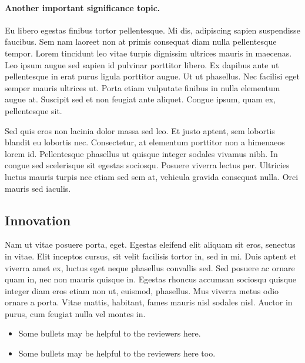 \documentclass[11pt,]{article}
\providecommand{\tightlist}{%
  \setlength{\itemsep}{0pt}\setlength{\parskip}{0pt}}
\let\oldparagraph\paragraph
\renewcommand{\paragraph}[1]{\oldparagraph{#1}\mbox{}}
\begin{document}
\hypertarget{another-important-significance-topic.}{%
\paragraph{Another important significance
topic.}\label{another-important-significance-topic.}}

Eu libero egestas finibus tortor pellentesque. Mi dis, adipiscing sapien
suspendisse faucibus. Sem nam laoreet non at primis consequat diam nulla
pellentesque tempor. Lorem tincidunt leo vitae turpis dignissim ultrices
mauris in maecenas. Leo ipsum augue sed sapien id pulvinar porttitor
libero. Ex dapibus ante ut pellentesque in erat purus ligula porttitor
augue. Ut ut phasellus. Nec facilisi eget semper mauris ultrices ut.
Porta etiam vulputate finibus in nulla elementum augue at. Suscipit sed
et non feugiat ante aliquet. Congue ipsum, quam ex, pellentesque sit.

Sed quis eros non lacinia dolor massa sed leo. Et justo aptent, sem
lobortis blandit eu lobortis nec. Consectetur, at elementum porttitor
non a himenaeos lorem id. Pellentesque phasellus ut quisque integer
sodales vivamus nibh. In congue sed scelerisque sit egestas sociosqu.
Posuere viverra lectus per. Ultricies luctus mauris turpis nec etiam sed
sem at, vehicula gravida consequat nulla. Orci mauris sed iaculis.

\hypertarget{innovation}{%
\subsection{Innovation}\label{innovation}}

Nam ut vitae posuere porta, eget. Egestas eleifend elit aliquam sit
eros, senectus in vitae. Elit inceptos cursus, sit velit facilisis
tortor in, sed in mi. Duis aptent et viverra amet ex, luctus eget neque
phasellus convallis sed. Sed posuere ac ornare quam in, nec non mauris
quisque in. Egestas rhoncus accumsan sociosqu quisque integer diam eros
etiam non ut, euismod, phasellus. Mus viverra metus odio ornare a porta.
Vitae mattis, habitant, fames mauris nisl sodales nisl. Auctor in purus,
cum feugiat nulla vel montes in.

\begin{itemize}
\tightlist
\item
  Some bullets may be helpful to the reviewers here.
\item
  Some bullets may be helpful to the reviewers here too.
\end{itemize}
\end{document}
